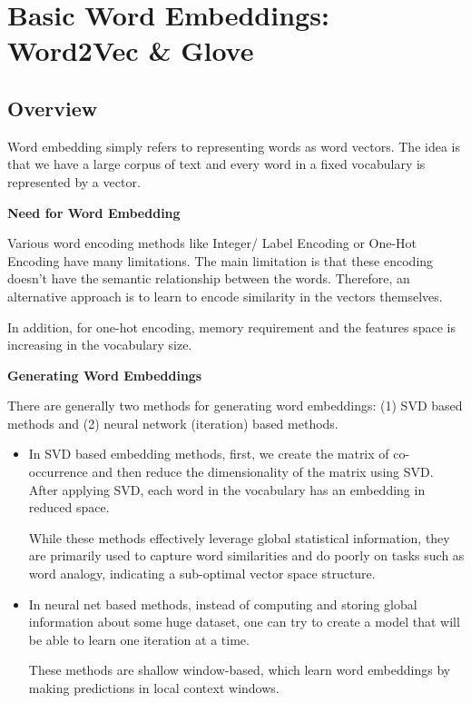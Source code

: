 \documentclass[
]{book}
\begin{document}
\hypertarget{basic-word-embeddings-word2vec-glove}{%
\chapter{Basic Word Embeddings: Word2Vec \& Glove}\label{basic-word-embeddings-word2vec-glove}}

\hypertarget{overview}{%
\section{Overview}\label{overview}}

Word embedding simply refers to representing words as word vectors. The idea is that we have a large corpus of text and every word in a fixed vocabulary is represented by a vector.

\textbf{Need for Word Embedding}

Various word encoding methods like Integer/ Label Encoding or One-Hot Encoding have many limitations. The main limitation is that these encoding doesn't have the semantic relationship between the words. Therefore, an alternative approach is to learn to encode similarity in the vectors themselves.

In addition, for one-hot encoding, memory requirement and the features space is increasing in the vocabulary size.

\textbf{Generating Word Embeddings}

There are generally two methods for generating word embeddings: (1) SVD based methods and (2) neural network (iteration) based methods.

\begin{itemize}
\item
  In SVD based embedding methods, first, we create the matrix of co-occurrence and then reduce the dimensionality of the matrix using SVD. After applying SVD, each word in the vocabulary has an embedding in reduced space.

  While these methods effectively leverage global statistical information, they are primarily used to capture word similarities and do poorly on tasks such as word analogy, indicating a sub-optimal vector space structure.
\item
  In neural net based methods, instead of computing and storing global information about some huge dataset, one can try to create a model that will be able to learn one iteration at a time.

  These methods are shallow window-based, which learn word embeddings by making predictions in local context windows.
\end{itemize}
\end{document}

